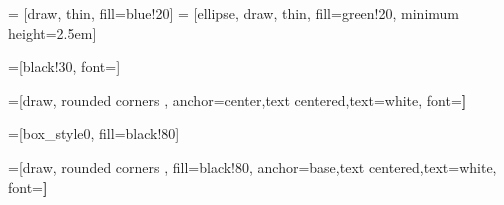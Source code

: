 
\usepackage[utf8]{inputenc}
\usepackage{lmodern}
\usepackage[T1]{fontenc}


\usepackage{array}
\usepackage{mathtools}%
\usepackage{wasysym}
\usepackage{amsfonts}
\usepackage{amssymb, amsbsy}
\usepackage[utf8]{inputenc}
\usepackage{graphicx}
\usepackage{multimedia}
\usepackage{multicol}
\usepackage{multirow}
\usepackage{fourier}
\usepackage{makecell}






\usepackage{tikz}
\usetikzlibrary{shapes,arrows,shadows,calc, angles}
\usetikzlibrary{arrows,shapes}
\usetikzlibrary{positioning}

\usepackage{verbatim}

 = [draw, thin, fill=blue!20]
 = [ellipse, draw, thin, fill=green!20, minimum height=2.5em]


\def\onlystyle<#1>#2#3{%
    \alt<#1>{%
        \tikzset{#2/.style = {#3}}
    }{%
        \tikzset{#2/.style = {}}
    }%
}


\newcommand{\txw}{\textwidth}
\newcommand{\txh}{\textheight}
\newcommand{\midX}{0.5\textwidth}
\newcommand{\midY}{0.5\textheight}

\newcommand{\xPageNumber}{105mm}
\newcommand{\yPageNumber}{3mm}
=[black!30, font=\small]
\newcommand{\nodePageNumber}{ \node[stylePageNumber] at (\xPageNumber, \yPageNumber) {\insertframenumber} ; }

=[draw, rounded corners ,
anchor=center,text centered,text=white, font=\bfseries] %

=[box_style0, fill=black!80] %

=[draw, rounded corners , fill=black!80,
anchor=base,text centered,text=white, font=\bfseries] %

